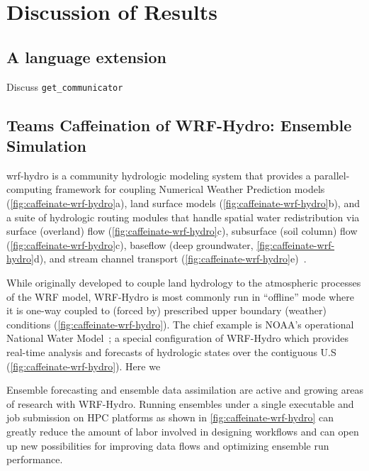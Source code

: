 \section{Discussion of Results}\label{sec:discussion}
\subsection{A language extension}
Discuss \lstinline|get_communicator|

\subsection{Teams Caffeination of WRF-Hydro: Ensemble Simulation}
\gls{wrf-hydro} is a community hydrologic modeling system that provides a parallel-computing
framework for coupling Numerical Weather Prediction models (\ref{fig:caffeinate-wrf-hydro}a), land surface models
(\ref{fig:caffeinate-wrf-hydro}b), and a suite of hydrologic routing modules that handle spatial water redistribution
via surface (overland) flow (\ref{fig:caffeinate-wrf-hydro}c), subsurface (soil column) flow (\ref{fig:caffeinate-wrf-hydro}c),
baseflow (deep groundwater, \ref{fig:caffeinate-wrf-hydro}d), and stream channel transport
(\ref{fig:caffeinate-wrf-hydro}e)~\cite{gochisEtal2014}.

While originally developed to couple land hydrology to the atmospheric processes of
the WRF model, WRF-Hydro is most commonly run in ``offline'' mode where it is one-way
coupled to (forced by) prescribed upper boundary (weather)
conditions (\ref{fig:caffeinate-wrf-hydro}). The chief example is NOAA's operational
National Water Model~\cite{noaa2016}; a special configuration of
WRF-Hydro which provides real-time analysis and forecasts of
hydrologic states over the contiguous U.S (\ref{fig:caffeinate-wrf-hydro}). Here we 

Ensemble forecasting and ensemble data assimilation are active and
growing areas of research with WRF-Hydro. Running ensembles under a
single executable and job submission on HPC platforms as shown in
\ref{fig:caffeinate-wrf-hydro} can greatly reduce the amount
of labor involved in designing workflows and can open up new
possibilities for improving data flows and optimizing ensemble run
performance. 

